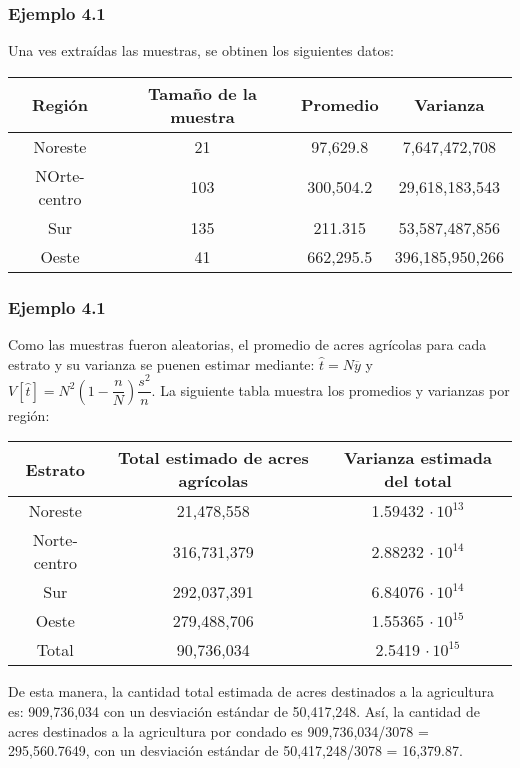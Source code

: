 \documentclass[hyperref={bookmarks=false},aspectratio=169, 10pt]{beamer}
\begin{document}

\begin{frame}
    \frametitle{Ejemplo 4.1}
      Una ves extraídas las muestras, se obtinen los siguientes datos:
  
      \begin{table}
          \centering
          \begin{tabular}{|c|c|c|c|}
              \hline
              \textbf{Región} & \textbf{Tamaño de la muestra} & \textbf{Promedio} & \textbf{Varianza}\\
              \hline
              Noreste & 21 & 97,629.8 & 7,647,472,708 \\
              \hline
              NOrte-centro & 103 & 300,504.2 & 29,618,183,543 \\
              \hline
              Sur & 135 & 211.315 & 53,587,487,856 \\
              \hline
              Oeste & 41 & 662,295.5 & 396,185,950,266 \\
              \hline
          \end{tabular}
      \end{table}
\end{frame}

\begin{frame}
  \frametitle{Ejemplo 4.1}
    Como las muestras fueron aleatorias, el promedio de acres agrícolas para cada estrato y su varianza se puenen estimar mediante: $ \hat{t} = N  \overline{y} $ y $\displaystyle V[\hat{t}] = N^2 \left( 1 - \dfrac{n}{N} \right) \dfrac{s^2}{n} $. La siguiente tabla muestra los promedios y varianzas por región:

    \begin{table}
        \centering
        \begin{tabular}{|c|c|c|}
            \hline
            \textbf{Estrato} & \textbf{Total estimado de acres agrícolas} & \textbf{Varianza estimada del total}\\
            \hline
            Noreste & 21,478,558 & 1.59432 $\cdot \, 10^{13}$ \\
            \hline
            Norte-centro & 316,731,379 & 2.88232 $\cdot \, 10^{14}$ \\
            \hline
            Sur & 292,037,391 & 6.84076 $\cdot \, 10^{14}$ \\
            \hline
            Oeste & 279,488,706 & 1.55365 $\cdot \, 10^{15}$ \\
            \hline\hline
            Total & 90,736,034 & 2.5419 $\cdot \, 10^{15}$ \\
            \hline
        \end{tabular}
    \end{table}

    De esta manera, la cantidad total estimada de acres destinados a la agricultura es: 909,736,034 con un desviación estándar de 50,417,248. Así, la cantidad de acres destinados a la agricultura por condado es 909,736,034/3078 = 295,560.7649, con un desviación estándar de 50,417,248/3078 = 16,379.87.
\end{frame}
\end{document}
